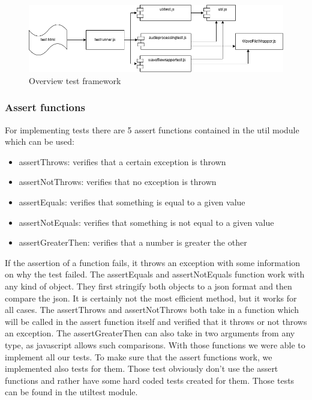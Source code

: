 \begin{figure}[H]
    \centering
    \includegraphics[width=\textwidth]{../assets/overview_test_framework.png}
    \caption{Overview test framework}\label{fig:overview-test-framework}
\end{figure}

\subsubsection{Assert functions}
For implementing tests there are 5 assert functions contained in the util module which can be used:

\begin{itemize}
    \item assertThrows: verifies that a certain exception is thrown
    \item assertNotThrows: verifies that no exception is thrown
    \item assertEquals: verifies that something is equal to a given value
    \item assertNotEquals: verifies that something is not equal to a given value
    \item assertGreaterThen: verifies that a number is greater the other
\end{itemize}

If the assertion of a function fails, it throws an exception with some information on why the test failed.
The assertEquals and assertNotEquals function work with any kind of object.
They first stringify both objects to a json format and then compare the json.
It is certainly not the most efficient method, but it works for all cases.
The assertThrows and assertNotThrows both take in a function which will be called in the assert function itself and verified that it throws or not throws an exception.
The assertGreaterThen can also take in two arguments from any type, as javascript allows such comparisons.
With those functions we were able to implement all our tests.
To make sure that the assert functions work, we implemented also tests for them.
Those test obviously don't use the assert functions and rather have some hard coded tests created for them.
Those tests can be found in the utiltest module.

